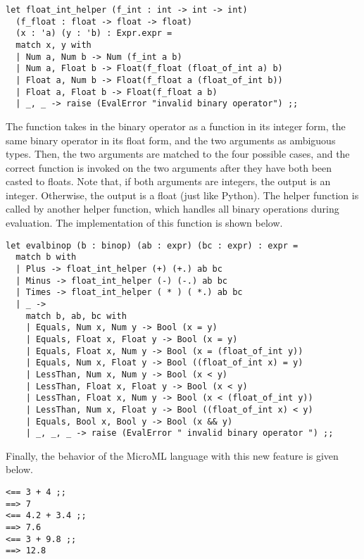 \documentclass{article}
\begin{document}
\begin{verbatim}
let float_int_helper (f_int : int -> int -> int) 
  (f_float : float -> float -> float) 
  (x : 'a) (y : 'b) : Expr.expr =
  match x, y with
  | Num a, Num b -> Num (f_int a b)
  | Num a, Float b -> Float(f_float (float_of_int a) b)
  | Float a, Num b -> Float(f_float a (float_of_int b))
  | Float a, Float b -> Float(f_float a b)
  | _, _ -> raise (EvalError "invalid binary operator") ;;
\end{verbatim}

The function takes in the binary operator as a function in its integer form, the same binary operator in its float form, and the two arguments as ambiguous types. Then, the two arguments are matched to the four possible cases, and the correct function is invoked on the two arguments after they have both been casted to floats. Note that, if both arguments are integers, the output is an integer. Otherwise, the output is a float (just like Python). The helper function is called by another helper function, which handles all binary operations during evaluation. The implementation of this function is shown below. 

\begin{verbatim}
let evalbinop (b : binop) (ab : expr) (bc : expr) : expr =
  match b with
  | Plus -> float_int_helper (+) (+.) ab bc
  | Minus -> float_int_helper (-) (-.) ab bc
  | Times -> float_int_helper ( * ) ( *.) ab bc
  | _ -> 
    match b, ab, bc with
    | Equals, Num x, Num y -> Bool (x = y)
    | Equals, Float x, Float y -> Bool (x = y)
    | Equals, Float x, Num y -> Bool (x = (float_of_int y))
    | Equals, Num x, Float y -> Bool ((float_of_int x) = y)
    | LessThan, Num x, Num y -> Bool (x < y)
    | LessThan, Float x, Float y -> Bool (x < y)
    | LessThan, Float x, Num y -> Bool (x < (float_of_int y))
    | LessThan, Num x, Float y -> Bool ((float_of_int x) < y)
    | Equals, Bool x, Bool y -> Bool (x && y)
    | _, _, _ -> raise (EvalError " invalid binary operator ") ;;
\end{verbatim}

Finally, the behavior of the MicroML language with this new feature is given below.

\begin{verbatim}
<== 3 + 4 ;;
==> 7
<== 4.2 + 3.4 ;;
==> 7.6
<== 3 + 9.8 ;;
==> 12.8
\end{verbatim}
\end{document}
